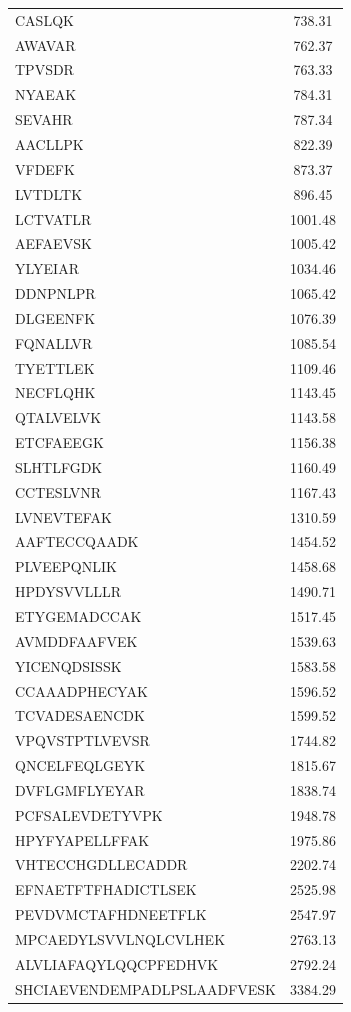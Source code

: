 \documentclass[%
 reprint,
 amsmath,amssymb,
 aps,
]{revtex4-2}
\begin{document}
\begin{longtable}{l|c}
CASLQK & 738.31\\
AWAVAR & 762.37\\
TPVSDR & 763.33\\
NYAEAK & 784.31\\
SEVAHR & 787.34\\
AACLLPK & 822.39\\
VFDEFK & 873.37\\
LVTDLTK & 896.45\\
LCTVATLR & 1001.48\\
AEFAEVSK & 1005.42\\
YLYEIAR & 1034.46\\
DDNPNLPR & 1065.42\\
DLGEENFK & 1076.39\\
FQNALLVR & 1085.54\\
TYETTLEK & 1109.46\\
NECFLQHK & 1143.45\\
QTALVELVK & 1143.58\\
ETCFAEEGK & 1156.38\\
SLHTLFGDK & 1160.49\\
CCTESLVNR & 1167.43\\
LVNEVTEFAK & 1310.59\\
AAFTECCQAADK & 1454.52\\
PLVEEPQNLIK & 1458.68\\
HPDYSVVLLLR & 1490.71\\
ETYGEMADCCAK & 1517.45\\
AVMDDFAAFVEK & 1539.63\\
YICENQDSISSK & 1583.58\\
CCAAADPHECYAK & 1596.52\\
TCVADESAENCDK & 1599.52\\
VPQVSTPTLVEVSR & 1744.82\\
QNCELFEQLGEYK & 1815.67\\
DVFLGMFLYEYAR & 1838.74\\
PCFSALEVDETYVPK & 1948.78\\
HPYFYAPELLFFAK & 1975.86\\
VHTECCHGDLLECADDR & 2202.74\\
EFNAETFTFHADICTLSEK & 2525.98\\
PEVDVMCTAFHDNEETFLK & 2547.97\\
MPCAEDYLSVVLNQLCVLHEK & 2763.13\\
ALVLIAFAQYLQQCPFEDHVK & 2792.24\\
SHCIAEVENDEMPADLPSLAADFVESK & 3384.29\\  \hline \hline 
\end{longtable}
\end{document}
